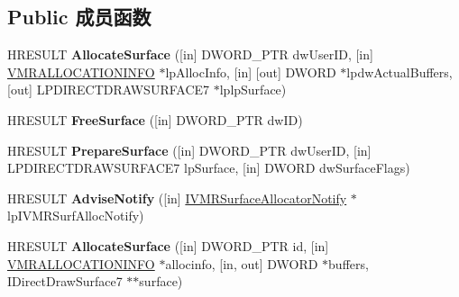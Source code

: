 \subsection*{Public 成员函数}
\begin{DoxyCompactItemize}
\item 
\mbox{\label{interface_i_v_m_r_surface_allocator_a61976f8954a43cc09cf20fd8b8ea7aab}} 
H\+R\+E\+S\+U\+LT {\bfseries Allocate\+Surface} (\mbox{[}in\mbox{]} D\+W\+O\+R\+D\+\_\+\+P\+TR dw\+User\+ID, \mbox{[}in\mbox{]} \hyperlink{structtag_v_m_r_a_l_l_o_c_a_t_i_o_n_i_n_f_o}{V\+M\+R\+A\+L\+L\+O\+C\+A\+T\+I\+O\+N\+I\+N\+FO} $\ast$lp\+Alloc\+Info, \mbox{[}in\mbox{]} \mbox{[}out\mbox{]} D\+W\+O\+RD $\ast$lpdw\+Actual\+Buffers, \mbox{[}out\mbox{]} L\+P\+D\+I\+R\+E\+C\+T\+D\+R\+A\+W\+S\+U\+R\+F\+A\+C\+E7 $\ast$lplp\+Surface)
\item 
\mbox{\label{interface_i_v_m_r_surface_allocator_a3d281594ccabd6ae75f3d2c1b96a9471}} 
H\+R\+E\+S\+U\+LT {\bfseries Free\+Surface} (\mbox{[}in\mbox{]} D\+W\+O\+R\+D\+\_\+\+P\+TR dw\+ID)
\item 
\mbox{\label{interface_i_v_m_r_surface_allocator_a739cc7c54d2a443669c9698663b05ad1}} 
H\+R\+E\+S\+U\+LT {\bfseries Prepare\+Surface} (\mbox{[}in\mbox{]} D\+W\+O\+R\+D\+\_\+\+P\+TR dw\+User\+ID, \mbox{[}in\mbox{]} L\+P\+D\+I\+R\+E\+C\+T\+D\+R\+A\+W\+S\+U\+R\+F\+A\+C\+E7 lp\+Surface, \mbox{[}in\mbox{]} D\+W\+O\+RD dw\+Surface\+Flags)
\item 
\mbox{\label{interface_i_v_m_r_surface_allocator_a2a3d41455d4a7fa3c041d7b568fe072a}} 
H\+R\+E\+S\+U\+LT {\bfseries Advise\+Notify} (\mbox{[}in\mbox{]} \hyperlink{interface_i_v_m_r_surface_allocator_notify}{I\+V\+M\+R\+Surface\+Allocator\+Notify} $\ast$lp\+I\+V\+M\+R\+Surf\+Alloc\+Notify)
\item 
\mbox{\label{interface_i_v_m_r_surface_allocator_afe7fb1569edd2ba6d1e6d4a28d58b94d}} 
H\+R\+E\+S\+U\+LT {\bfseries Allocate\+Surface} (\mbox{[}in\mbox{]} D\+W\+O\+R\+D\+\_\+\+P\+TR id, \mbox{[}in\mbox{]} \hyperlink{structtag_v_m_r_a_l_l_o_c_a_t_i_o_n_i_n_f_o}{V\+M\+R\+A\+L\+L\+O\+C\+A\+T\+I\+O\+N\+I\+N\+FO} $\ast$allocinfo, \mbox{[}in, out\mbox{]} D\+W\+O\+RD $\ast$buffers, I\+Direct\+Draw\+Surface7 $\ast$$\ast$surface)
$$
\end{DoxyCompactItemize}
